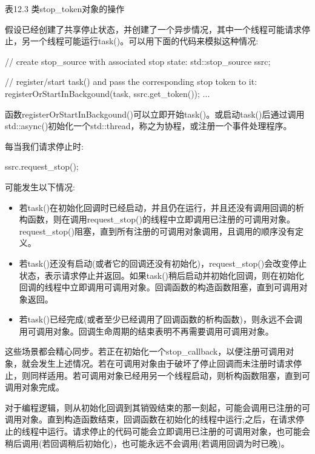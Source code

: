 \begin{center}
表12.3 类stop\_token对象的操作
\end{center}

假设已经创建了共享停止状态，并创建了一个异步情况，其中一个线程可能请求停止，另一个线程可能运行task()。可以用下面的代码来模拟这种情况:

\begin{cpp}
// create stop_source with associated stop state:
std::stop_source ssrc;

// register/start task() and pass the corresponding stop token to it:
registerOrStartInBackgound(task, ssrc.get_token());
...
\end{cpp}

函数registerOrStartInBackgound()可以立即开始task()。或启动task()后通过调用std::async()初始化一个std::thread，称之为协程，或注册一个事件处理程序。

每当我们请求停止时:

\begin{cpp}
ssrc.request_stop();
\end{cpp}

可能发生以下情况:

\begin{itemize}
\item
若task()在初始化回调时已经启动，并且仍在运行，并且还没有调用回调的析构函数，则在调用request\_stop()的线程中立即调用已注册的可调用对象。request\_stop()阻塞，直到所有注册的可调用对象调用，且调用的顺序没有定义。

\item
若task()还没有启动(或者它的回调还没有初始化)，request\_stop()会改变停止状态，表示请求停止并返回。如果task()稍后启动并初始化回调，则在初始化回调的线程中立即调用可调用对象。回调函数的构造函数阻塞，直到可调用对象返回。

\item
若task()已经完成(或者至少已经调用了回调函数的析构函数)，则永远不会调用可调用对象。回调生命周期的结束表明不再需要调用可调用对象。
\end{itemize}

这些场景都会精心同步。若正在初始化一个stop\_callback，以便注册可调用对象，就会发生上述情况。若在可调用对象由于破坏了停止回调而未注册时请求停止，则同样适用。若可调用对象已经用另一个线程启动，则析构函数阻塞，直到可调用对象完成。

对于编程逻辑，则从初始化回调到其销毁结束的那一刻起，可能会调用已注册的可调用对象。直到构造函数结束，回调函数在初始化的线程中运行;之后，在请求停止的线程中运行。请求停止的代码可能会立即调用已注册的可调用对象，也可能会稍后调用(若回调稍后初始化)，也可能永远不会调用(若调用回调为时已晚)。

